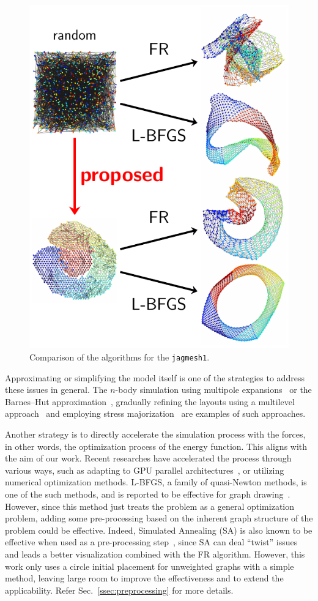 \documentclass[dvipdfmx,10pt,journal,compsoc]{IEEEtran}
\begin{document}
\begin{figure}[t]
  \centering
  \includegraphics[width=0.8\columnwidth]{fig1/fig1.pdf}
  \caption{
    Comparison of the algorithms for the \texttt{jagmesh1}.
  }
  \label{fig:fig1}
\end{figure}

Approximating or simplifying the model itself is one of the strategies to address these issues in general.
The $n$-body simulation using multipole expansions~\cite{greengardFastAlgorithmParticle1987} or the Barnes--Hut approximation~\cite{barnesHierarchicalLogForcecalculation1986}, gradually refining the layouts using a multilevel approach~\cite{Hu2006EfficientHF} and employing stress majorization~\cite{gansnerGraphDrawingStress2005} are examples of such approaches.

Another strategy is to directly accelerate the simulation process with the forces, in other words, the optimization process of the energy function.
This aligns with the aim of our work.
Recent researches have accelerated the process through various ways, such as adapting to GPU parallel architectures~\cite{gajdosParallelFruchtermanReingold2016}, or utilizing numerical optimization methods.
L-BFGS, a family of quasi-Newton methods, is one of the such methods, and is reported to be effective for graph drawing~\cite{6183577}.
However, since this method just treats the problem as a general optimization problem, adding some pre-processing based on the inherent graph structure of the problem could be effective.
Indeed, Simulated Annealing (SA) is also known to be effective when used as a pre-processing step~\cite{ghassemitoosiSimulatedAnnealingPreProcessing2016}, since SA can deal ``twist'' issues and leads a better visualization combined with the FR algorithm.
However, this work only uses a circle initial placement for unweighted graphs with a simple method, leaving large room to improve the effectiveness and to extend the applicability. Refer Sec.~\ref{ssec:preprocessing} for more details.
\end{document}
